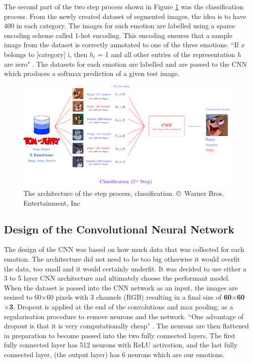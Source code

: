\documentclass[report, 11pt, oneside]{dissertation}
\begin{document}
The second part of the two step process shown in Figure \ref{fig:design_2} was the classification process. From the newly created dataset of segmented images, the idea is to have 400 in each category. The images for each emotion are labelled using a sparse encoding scheme called 1-hot encoding. This encoding ensures that a sample image from the dataset is correctly annotated to one of the three emotions. ``If $x$ belongs to [category] i, then $h_i$ = 1 and all other entries of the representation $h$ are zero" \citep[146]{Goodfellow-et-al-2016}. The datasets for each emotion are labelled and are passed to the CNN which produces a softmax prediction of a given test image.

\begin{figure}[!htb]
   \centering
	\includegraphics[scale=0.45]{figure_25.pdf}
	\caption[The architecture of the  step process.]{The architecture of the  step process, classification. \copyright \ Warner Bros. Entertainment, Inc}
	\label{fig:design_2}
\end{figure}

\subsection{Design of the Convolutional Neural Network}

The design of the CNN was based on how much data that was collected for each emotion. The architecture did not need to be too big otherwise it would overfit the data, too small and it would certainly underfit. It was decided to use either a 3 to 5 layer CNN architecture and ultimately choose the performant model. When the dataset is passed into the CNN network as an input, the images are resized to 60$\times$60 pixels with 3 channels (RGB) resulting in a final size of \textbf{60$\times$60$\times$3}. Dropout is applied at the end of the convolutions and max pooling; as a regularisation procedure to remove neurons and the network. ``One advantage of dropout is that it is very computationally cheap" \citep[257]{Goodfellow-et-al-2016}. The neurons are then flattened in preparation to become passed into the two fully connected layers. The first fully connected layer has 512 neurons with ReLU activation, and the last fully connected layer, (the output layer) has 6 neurons which are our emotions. 
\end{document}
